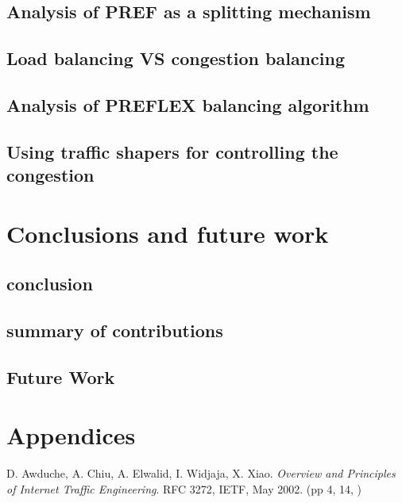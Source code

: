 \documentclass[mres, **20pt**]{ucl_thesis}
\begin{document}
\section{Analysis of PREF as a splitting mechanism}
\section{Load balancing VS congestion balancing}
\section{Analysis of PREFLEX balancing algorithm}
\section{Using traffic shapers for controlling the congestion}
\chapter{Conclusions and future work}
\section{conclusion}
\section{summary of contributions}
\section{Future Work}
%


\chapter{Appendices}
%



\begin{thebibliography}{9}
D. Awduche, A. Chiu, A. Elwalid, I. Widjaja, X. Xiao. \emph{Overview and Principles of Internet Traffic Engineering}. RFC 3272, IETF, May 2002. (pp 4, 14, )
\end{thebibliography}
\end{document}

